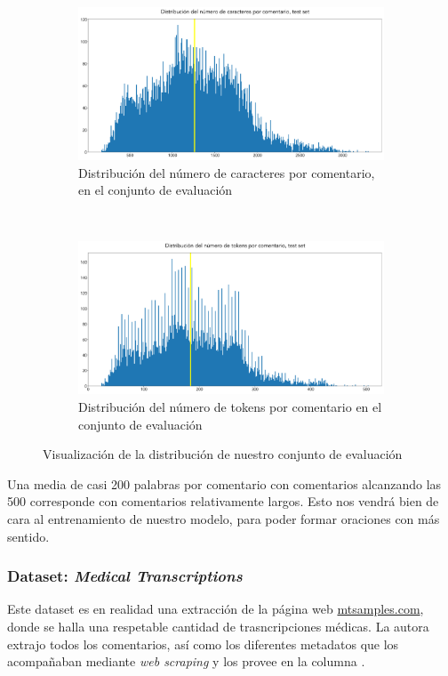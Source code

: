 \begin{figure}[h!]
	\centering
	\begin{subfigure}[t]{0.95\textwidth}
		\centering
		\includegraphics[width=.9\textwidth]{media/char_hist_test.pdf}
		\caption{Distribución del número de caracteres por comentario, en el conjunto de evaluación}
		\label{fig:avg_char_test_test}
	\end{subfigure}

	~

	\begin{subfigure}[t]{0.95\textwidth}
		\centering
		\includegraphics[width=.9\textwidth]{media/tokens_hist_test.pdf}
		\caption{Distribución del número de tokens por comentario en el conjunto de evaluación}
		\label{fig:avg_tokens_test}
	\end{subfigure}


	\caption{Visualización de la distribución de nuestro conjunto de evaluación}
	\label{fig:sum_test}
\end{figure}

Una media de casi 200 palabras por comentario con comentarios alcanzando las 500 corresponde con comentarios relativamente largos. Esto nos vendrá bien de cara al entrenamiento de nuestro modelo, para poder formar oraciones con más sentido.


\subsubsection{Dataset: \textit{Medical Transcriptions}}
Este dataset es en realidad una extracción de la página web \url{mtsamples.com}, donde se halla una respetable cantidad de trasncripciones médicas. La autora extrajo todos los comentarios, así como los diferentes metadatos que los acompañaban mediante \textit{web scraping} y los provee en la columna .

